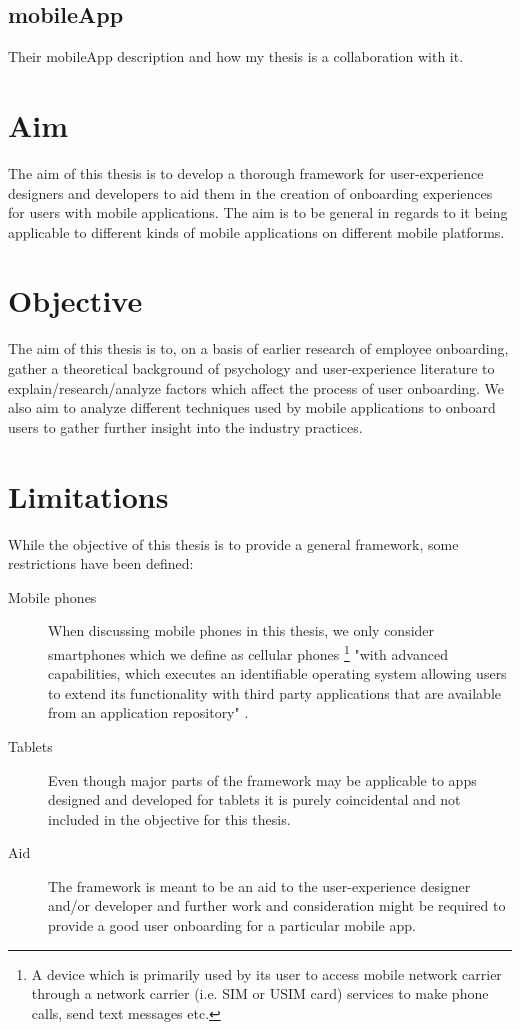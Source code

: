 \subsection{mobileApp}
Their mobileApp description and how my thesis is a collaboration with it.

\section{Aim}
The aim of this thesis is to develop a thorough framework for user-experience designers and developers to aid them in the creation of onboarding experiences for users with mobile applications. The aim is to be general in regards to it being applicable to different kinds of mobile applications on different mobile platforms.

\section{Objective}
The aim of this thesis is to, on a basis of earlier research of employee onboarding, gather a theoretical background of psychology and user-experience literature to explain/research/analyze factors which affect the process of user onboarding. We also aim to analyze different techniques used by mobile applications to onboard users to gather further insight into the industry practices.

\section{Limitations}
While the objective of this thesis is to provide a general framework, some restrictions have been defined:
\begin{description}
  \item[Mobile phones] When discussing mobile phones in this thesis, we only consider smartphones which we define as cellular phones \footnote{A device which is primarily used by its user to access mobile network carrier through a network carrier (i.e. SIM or USIM card) services to make phone calls, send text messages etc.} "with advanced capabilities, which executes an identifiable operating system allowing users to extend its functionality with third party applications that are available from an application repository" \cite{Theoharidou2012}.
  \item[Tablets] Even though major parts of the framework may be applicable to apps designed and developed for tablets it is purely coincidental and not included in the objective for this thesis.
  \item[Aid] The framework is meant to be an aid to the user-experience designer and/or developer and further work and consideration might be required to provide a good user onboarding for a particular mobile app.
\end{description}

